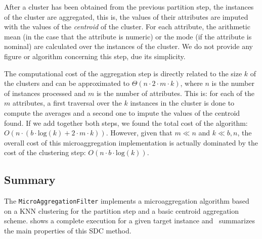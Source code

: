 After a cluster has been obtained from the previous partition step, the instances of the cluster are aggregated, this is, the values of their attributes are imputed with the values of the \textit{centroid} of the cluster. For each attribute, the arithmetic mean (in the case that the attribute is numeric) or the mode (if the attribute is nominal) are calculated over the instances of the cluster. We do not provide any figure or algorithm concerning this step, due its simplicity.

The computational cost of the aggregation step is directly related to the size $k$ of the clusters and can be approximated to $\Theta(n \cdot 2 \cdot m \cdot k)$, where $n$ is the number of instances processed and $m$ is the number of attributes. This is: for each of the $m$ attributes, a first traversal over the $k$ instances in the cluster is done to compute the averages and a second one to impute the values of the centroid found. If we add together both steps, we found the total cost of the algorithm: $O(n \cdot (b \cdot \mathrm{log}(k) + 2 \cdot m \cdot k))$. However, given that $m \ll n$ and $k \ll b, n$, the overall cost of this microaggregation implementation is actually dominated by the cost of the clustering step: $O(n \cdot b \cdot \mathrm{log}(k))$.

\subsection{Summary}
\label{Implementation:Microaggregation:Summary}

The \texttt{MicroAggregationFilter} implements a microaggregation algorithm based on a KNN clustering for the partition step and a basic centroid aggregation scheme.  shows a complete execution for a given target instance and~ summarizes the main properties of this SDC method.

